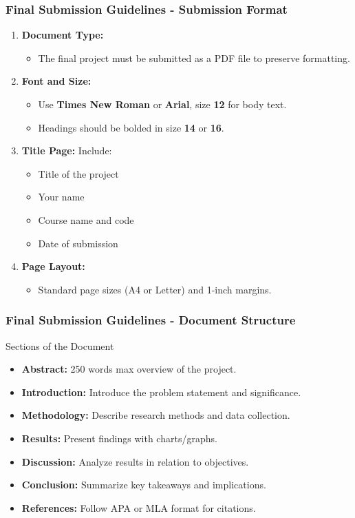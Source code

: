\documentclass[aspectratio=169]{beamer}
\begin{document}
\begin{frame}[fragile]
  \frametitle{Final Submission Guidelines - Submission Format}
  \begin{enumerate}
    \item \textbf{Document Type:} 
      \begin{itemize}
        \item The final project must be submitted as a PDF file to preserve formatting.
      \end{itemize}
      
    \item \textbf{Font and Size:} 
      \begin{itemize}
        \item Use \textbf{Times New Roman} or \textbf{Arial}, size \textbf{12} for body text.
        \item Headings should be bolded in size \textbf{14} or \textbf{16}.
      \end{itemize}
      
    \item \textbf{Title Page:} Include:
      \begin{itemize}
        \item Title of the project
        \item Your name
        \item Course name and code
        \item Date of submission
      \end{itemize}
      
    \item \textbf{Page Layout:} 
      \begin{itemize}
        \item Standard page sizes (A4 or Letter) and 1-inch margins.
      \end{itemize}
  \end{enumerate}
\end{frame}

\begin{frame}[fragile]
  \frametitle{Final Submission Guidelines - Document Structure}
  \begin{block}{Sections of the Document}
    \begin{itemize}
      \item \textbf{Abstract:} 250 words max overview of the project.
      \item \textbf{Introduction:} Introduce the problem statement and significance.
      \item \textbf{Methodology:} Describe research methods and data collection.
      \item \textbf{Results:} Present findings with charts/graphs.
      \item \textbf{Discussion:} Analyze results in relation to objectives.
      \item \textbf{Conclusion:} Summarize key takeaways and implications.
      \item \textbf{References:} Follow APA or MLA format for citations.
    \end{itemize}
  \end{block}
\end{frame}
\end{document}
